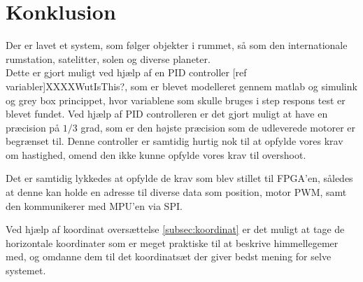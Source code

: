 \section{Konklusion}
Der er lavet et system, som følger objekter i rummet, så som den internationale rumstation, satelitter, solen og diverse planeter.\\
Dette er gjort muligt ved hjælp af en PID controller [ref variabler]XXXXWutIsThis?, som er blevet modelleret gennem matlab og simulink og grey box princippet, hvor variablene som skulle bruges i step respons test er blevet fundet. Ved hjælp af PID controlleren er det gjort muligt at have en præcision på $1/3$ grad, som er den højste præcision som de udleverede motorer er begrænset til. Denne controller er samtidig hurtig nok til at opfylde vores krav om hastighed, omend den ikke kunne opfylde vores krav til overshoot.

Det er samtidig lykkedes at opfylde de krav som blev stillet til FPGA'en, således at denne kan holde en adresse til diverse data som position, motor PWM, samt den kommunikerer med MPU'en via SPI.

Ved hjælp af koordinat oversættelse \ref{subsec:koordinat} er det muligt at tage de horizontale koordinater som er meget praktiske til at beskrive himmellegemer med, og omdanne dem til det koordinatsæt der giver bedst mening for selve systemet.